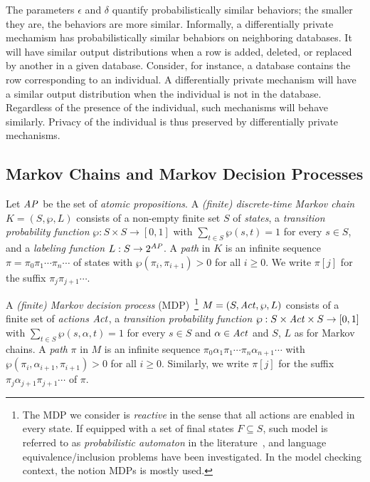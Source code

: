 The parameters $\epsilon$ and $\delta$ quantify probabilistically
similar behaviors;
the smaller they are, the behaviors are more similar.
Informally, a differentially private mechamism has probabilistically
similar behabiors on neighboring databases. It will have similar
output distributions when a row is added, deleted, or replaced by
another in a given
database. Consider, for instance, a database contains the row
corresponding to an individual. A differentially private mechanism
will have a similar output distribution when the individual is not in
the database. Regardless of the presence of the individual, such
mechanisms will behave similarly. Privacy of the individual is thus
preserved by differentially private mechanisms. 

\subsection{Markov Chains and Markov Decision Processes}

Let $\mathit{AP}$ be the set of \emph{atomic propositions}.
A \emph{(finite) discrete-time Markov chain} $K = (S, \wp, L)$ consists
of a non-empty finite set $S$ of \emph{states}, a \emph{transition
  probability function} $\wp : S \times S \rightarrow [0, 1]$ with
$\sum_{t \in S} \wp(s, t) = 1$ for every $s \in S$, and
a \emph{labeling function} $L : S \rightarrow 2^{\mathit{AP}}$. A \emph{path}
in $K$ is an infinite sequence $\pi = \pi_0 \pi_1 \cdots \pi_n \cdots$
of states with $\wp (\pi_i, \pi_{i+1}) > 0$ for all $i \geq 0$. We write
$\pi[j]$ for the suffix $\pi_j \pi_{j+1} \cdots$. %

A \emph{(finite) Markov decision process} 
(MDP)~\footnote{The MDP we consider is \emph{reactive} in the sense that 
all actions are enabled in every state. If equipped with a set of final states $F\subseteq S$, such model is
referred to as \emph{probabilistic automaton} in the literature~\cite{Rabin63}, and language equivalence/inclusion
problems have been investigated. In the model checking context, the notion MDPs is mostly used.}
 $M = (S, \mathit{Act}, \wp, L)$ consists
of 
a finite set of \emph{actions} $\mathit{Act}$,
a \emph{transition probability function} $\wp : S \times \mathit{Act}
\times S \rightarrow [0, 1]$ with $\sum_{t \in S} \wp(s, \alpha, t)
= 1$ for every $s \in S$ and $\alpha \in \mathit{Act}$ and $S$,
$L$ as for Markov chains.
A \emph{path} $\pi$ in $M$ is an infinite sequence $\pi_0 \alpha_1
\pi_1 \cdots \pi_n \alpha_{n+1} \cdots$ with
$\wp(\pi_i, \alpha_{i+1}, \pi_{i+1}) > 0$ for all $i \geq 0$.
Similarly, we write $\pi[j]$ for the suffix $\pi_j \alpha_{j+1}
\pi_{j+1} \cdots$ of $\pi$.


